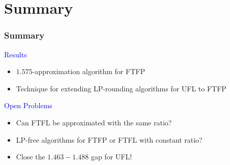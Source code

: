 \documentclass[hyperref,dvipsnames,svgnames,compress]{beamer}
\begin{document}
\section[End]{Summary}

\begin{frame}
  \frametitle{Summary}
  
{\large
  {\textcolor{blue}{Results}}

  \begin{itemize}
  	\item $1.575$-approximation algorithm for FTFP
	\item Technique for extending LP-rounding algorithms for UFL to FTFP
  \end{itemize}

\vspace{0.2in}
\pause
  {\textcolor{blue}{Open Problems}}

  \begin{itemize}
  \item Can FTFL be approximated with the same ratio?
  \item LP-free algorithms for FTFP or FTFL with constant ratio?
  \item Close the $1.463-1.488$ gap for UFL!
  \end{itemize}
}

\end{frame}
\end{document}
